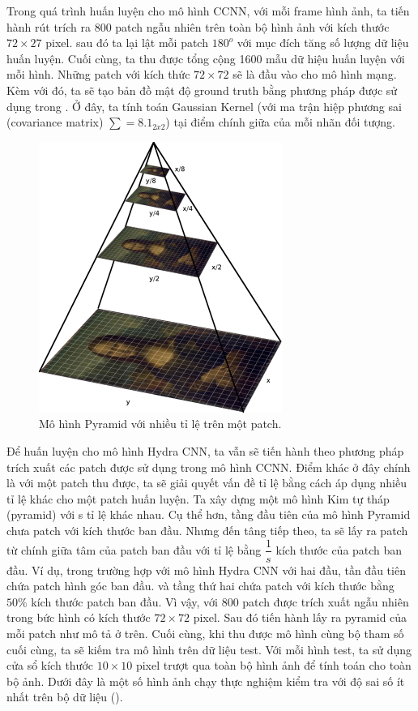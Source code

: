 	Trong quá trình huấn luyện cho mô hình CCNN, với mỗi frame hình ảnh, ta tiến hành rút trích ra 800 patch ngẫu nhiên trên toàn bộ hình ảnh với kích thước $72 \times 27$ pixel. sau đó ta lại lật mỗi patch $180^o$ với mục đích tăng số lượng dữ liệu huấn luyện. Cuối cùng, ta thu được tổng cộng 1600 mẫu dữ hiệu huấn luyện với mỗi hình. Những patch với kích thức $72 \times 72 $ sẽ là đầu vào cho mô hình mạng. Kèm với đó, ta sẽ tạo bản đồ mật độ ground truth bằng phương pháp được sử dụng trong \cite{lempitsky2010learning}. Ở đây, ta tính toán Gaussian Kernel (với ma trận hiệp phương sai (covariance matrix) $\sum = 8.1_{2x2}$) tại điểm chính giữa của mỗi nhãn đối tượng.\par
\begin{figure}[ht]
  			\begin{center}
    				\includegraphics[scale=0.7]{pyramid} 
    				\caption{Mô hình Pyramid với nhiều tỉ lệ trên một patch.}
    				\label{pyramid}
  			\end{center}
\end{figure}	
	Để huấn luyện cho mô hình Hydra CNN, ta vẫn sẽ tiến hành theo phương pháp trích xuất các patch được sử dụng trong mô hình CCNN. Điểm khác ở đây chính là với một patch thu được, ta sẽ giải quyết vấn đề tỉ lệ bằng cách áp dụng nhiều tỉ lệ khác cho một patch huấn luyện. Ta xây dựng một mô hình Kim tự tháp (pyramid) với s tỉ lệ khác nhau. Cụ thể hơn, tầng đầu tiên của mô hình Pyramid chưa patch với kích thước ban đầu. Nhưng đến tâng tiếp theo, ta sẽ lấy ra patch từ chính giữa tâm của patch ban đầu với tỉ lệ bằng $\dfrac{1}{s}$ kích thước của patch ban đầu. Ví dụ, trong trường hợp với mô hình Hydra CNN với hai đầu, tần đầu tiên chứa patch hình góc ban đầu. và tầng thứ hai chứa patch với kích thước bằng $50\%$ kích thước patch ban đầu. Vì vậy, với 800 patch được trích xuất ngẫu nhiên trong bức hình có kích thước $72 \times 72$ pixel. Sau đó tiến hành lấy ra pyramid của mỗi patch như mô tả ở trên. Cuối cùng, khi thu được mô hình cùng bộ tham số cuối cùng, ta sẽ kiếm tra mô hình trên dữ liệu test. Với mỗi hình test, ta sử dụng cửa sổ kích thước $10\times10 $ pixel trượt qua toàn bộ hình ảnh để tính toán cho toàn bộ ảnh. Dưới đây là một số hình ảnh chạy thực nghiệm kiểm tra với độ sai số ít nhất trên bộ dữ liệu (). 


